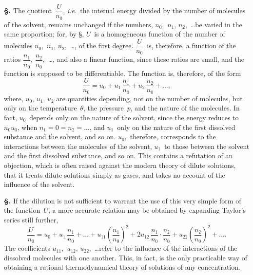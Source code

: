 \documentclass[12pt]{book}[2005/09/16]
\newcommand{\Chg}[2]{#2}
\newcommand{\Add}[1]{\Chg{}{#1}}
\newcommand{\Section}[1]{
  \medskip\par\textbf{§\;#1}
  \label{section:#1}
}
\newcommand{\SecRef}[2][§\;]{\hyperref[section:#2.]{{\upshape #1#2}}}
\newcommand{\PageSep}[1]{\ignorespaces}
\newcommand{\ie}{\emph{i.e.}}
\begin{document}
\Section{251.} The quotient~$\dfrac{U}{n_{0}}$, \ie\ the internal energy divided
%
by the number of molecules of the solvent, remains unchanged
if the numbers, $n_{0}$,~$n_{1}$, $n_{2}$\Add{,}~\dots be varied in the same
proportion; for, by \SecRef{201}, $U$~is a homogeneous function of
the number of molecules $n_{0}$,~$n_{1}$, $n_{2}$,~\dots, of the first degree.
$\dfrac{U}{n_{0}}$~is, therefore, a function of the ratios $\dfrac{n_{1}}{n_{0}}$, $\dfrac{n_{2}}{n_{0}}$,~\dots, and also a
linear function, since these ratios are small, and the function
is supposed to be differentiable. The function is, therefore,
of the form
\[
\frac{U}{n_{0}} = u_{0} + u_{1}\, \frac{n_{1}}{n_{0}} + u_{2}\, \frac{n_{2}}{n_{0}} + \dots\Add{,}
\]
where, $u_{0}$, $u_{1}$, $u_{2}$ are quantities depending, not on the number
of molecules, but only on the temperature~$\theta$, the pressure~$p$,
and the nature of the molecules. In fact, $u_{0}$~depends only
on the nature of the solvent, since the energy reduces to
$n_{0} u_{0}$, when $n_{1} = 0 = n_{2} = \dots$, and $u_{1}$~only on the nature of
the first dissolved substance and the solvent, and so on.
$u_{0}$,~therefore, corresponds to the interactions between the
molecules of the solvent, $u_{1}$~to those between the solvent
and the first dissolved substance, and so on. This contains
a refutation of an objection, which is often raised against the
modern theory of dilute solutions, that it treats dilute solutions
%
simply as gases, and takes no account of the influence
of the solvent.
\PageSep{225}

\Section{252.} If the dilution is not sufficient to warrant the use
%
%
of this very simple form of the function~$U$, a more accurate
relation may be obtained by expanding Taylor's series still
further,
\[
\frac{U}{n_{0}}
  = u_{0} + u_{1}\, \frac{n_{1}}{n_{0}} + \dots
  + u_{11} \left(\frac{n_{1}}{n_{0}}\right)^{2}
  + 2u_{12}\, \frac{n_{1}}{n_{0}} · \frac{n_{2}}{n_{0}}
  + u_{22} \left(\frac{n_{2}}{n_{0}}\right)^{2}
  + \dots\Add{.}
\]
The coefficients $u_{11}$,~$u_{12}$, $u_{22}$,~\dots refer to the influence of the
interactions of the dissolved molecules with one another.
This, in fact, is the only practicable way of obtaining a
rational thermodynamical theory of solutions of any concentration.
\end{document}
